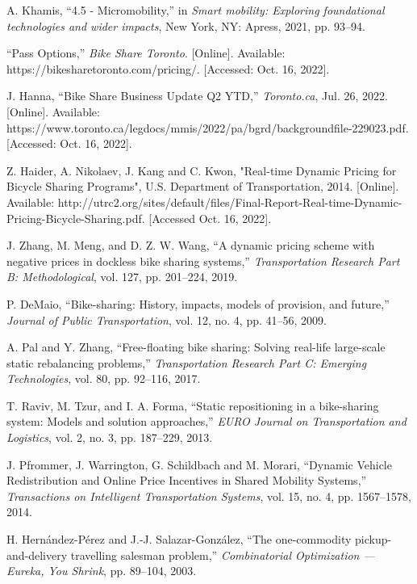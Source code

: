 \documentclass[conference]{IEEEtran}
\begin{document}
\begin{thebibliography}{00}

 A. Khamis, ``4.5 - Micromobility,'' in \emph{Smart mobility: Exploring foundational technologies and wider impacts}, New York, NY: Apress, 2021, pp. 93–94. 

 ``Pass Options,'' \emph{Bike Share Toronto}. [Online]. Available: https://bikesharetoronto.com/pricing/. [Accessed: Oct. 16, 2022]. 

 J. Hanna, ``Bike Share Business Update Q2 YTD,'' \emph{Toronto.ca}, Jul. 26, 2022. [Online]. Available: https://www.toronto.ca/legdocs/mmis/2022/pa/bgrd/backgroundfile-229023.pdf. [Accessed: Oct. 16, 2022]. 

Z. Haider, A. Nikolaev, J. Kang and C. Kwon, "Real-time Dynamic Pricing for Bicycle Sharing Programs", U.S. Department of Transportation, 2014. [Online]. Available: http://utrc2.org/sites/default/files/Final-Report-Real-time-Dynamic-Pricing-Bicycle-Sharing.pdf. [Accessed Oct. 16, 2022].

J. Zhang, M. Meng, and D. Z. W. Wang, ``A dynamic pricing scheme with negative prices in dockless bike sharing systems,'' \emph{Transportation Research Part B: Methodological}, vol. 127, pp. 201–224, 2019. 

P. DeMaio, ``Bike-sharing: History, impacts, models of provision, and future,'' \emph{Journal of Public Transportation}, vol. 12, no. 4, pp. 41–56, 2009. 

A. Pal and Y. Zhang, ``Free-floating bike sharing: Solving real-life large-scale static rebalancing problems,'' \emph{Transportation Research Part C: Emerging Technologies}, vol. 80, pp. 92–116, 2017. 

T. Raviv, M. Tzur, and I. A. Forma, ``Static repositioning in a bike-sharing system: Models and solution approaches,'' \emph{EURO Journal on Transportation and Logistics}, vol. 2, no. 3, pp. 187–229, 2013. 

J. Pfrommer, J. Warrington, G. Schildbach and M. Morari, ``Dynamic Vehicle Redistribution and Online Price Incentives in Shared Mobility Systems,'' \emph{Transactions on Intelligent Transportation Systems}, vol. 15, no. 4, pp. 1567–1578, 2014. 

H. Hernández-Pérez and J.-J. Salazar-González, ``The one-commodity pickup-and-delivery travelling salesman problem,'' \emph{Combinatorial Optimization — Eureka, You Shrink}, pp. 89–104, 2003.


\end{thebibliography}
\end{document}
